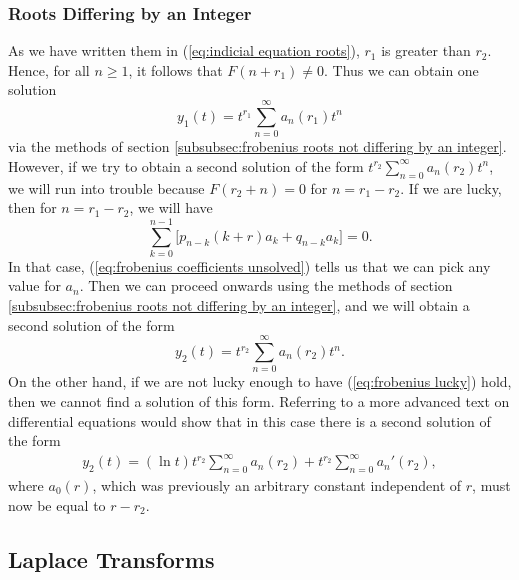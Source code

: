 \documentclass{myart}
\newcommand{\eq}[1]{(\ref{eq:#1})}
\begin{document}
\subsubsection{Roots Differing by an Integer} \label{subsubsec:frobenius roots differing by an integer}

As we have written them in \eq{indicial equation roots}, $r_1$ is greater than $r_2$. Hence, for all $n \geq 1$, it follows that $F(n + r_1) \neq 0$. Thus we can obtain one solution
\begin{equation*}
y_1(t) = t^{r_1} \sum_{n=0}^\infty a_n(r_1) t^n
\end{equation*}
via the methods of section \ref{subsubsec:frobenius roots not differing by an integer}. However, if we try to obtain a second solution of the form $t^{r_2} \sum_{n=0}^\infty a_n(r_2) t^n$, we will run into trouble because $F(r_2 + n) = 0$ for $n = r_1 - r_2$. If we are lucky, then for $n = r_1 - r_2$, we will have
\begin{equation} \label{eq:frobenius lucky}
\sum_{k=0}^{n-1} \Big[p_{n-k} (k+r) a_k + q_{n-k} a_k\Big] = 0.
\end{equation}
In that case, \eq{frobenius coefficients unsolved} tells us that we can pick any value for $a_n$. Then we can proceed onwards using the methods of section \ref{subsubsec:frobenius roots not differing by an integer}, and we will obtain a second solution of the form
\begin{equation*}
y_2(t) = t^{r_2} \sum_{n=0}^\infty a_n(r_2) t^n.
\end{equation*}
On the other hand, if we are not lucky enough to have \eq{frobenius lucky} hold, then we cannot find a solution of this form. Referring to a more advanced text on differential equations would show that in this case there is a second solution of the form
\begin{align*}
y_2(t) = (\ln t) t^{r_2} \sum_{n=0}^\infty a_n(r_2) + t^{r_2} \sum_{n=0}^\infty a_n'(r_2),
\end{align*}
where $a_0(r)$, which was previously an arbitrary constant independent of $r$, must now be equal to $r - r_2$.

\subsection{Laplace Transforms} \label{subsec:laplace}
\end{document}
